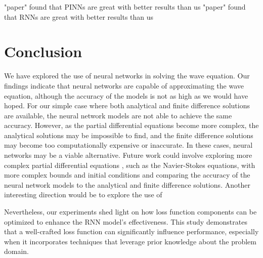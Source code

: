 \documentclass[twoside,11pt]{report}
\begin{document}
    "paper" found that PINNs are great with better results than us
    "paper" found that RNNs are great with better results than us

    
\section{Conclusion}
\label{sec:conclusion}

    We have explored the use of neural networks in solving the wave equation. Our findings indicate that
    neural networks are capable of approximating the wave equation, although the accuracy of the models
    is not as high as we would have hoped. For our simple case where both analytical and finite difference
    solutions are available, the neural network models are not able to achieve the same accuracy. 
    However, as the partial differential equations become
    more complex, the analytical solutions may be impossible to find, and the finite difference solutions
    may become too computationally expensive or inaccurate. In these cases, neural networks may be a
    viable alternative.
    Future work could involve exploring more complex partial differential equations , such as the
    Navier-Stokes equations, with more complex bounds and initial conditions 
    and comparing the accuracy of the neural network models to the analytical
    and finite difference solutions. Another interesting direction would be to explore the use of


        Nevertheless, our experiments shed light on how loss function components can be optimized 
    to enhance the RNN model's effectiveness. This study demonstrates that a well-crafted loss 
    function can significantly influence performance, especially when it incorporates techniques 
    that leverage prior knowledge about the problem domain.
    
     










%
%
%
%




\vskip 0.2in

% 

\end{document}
